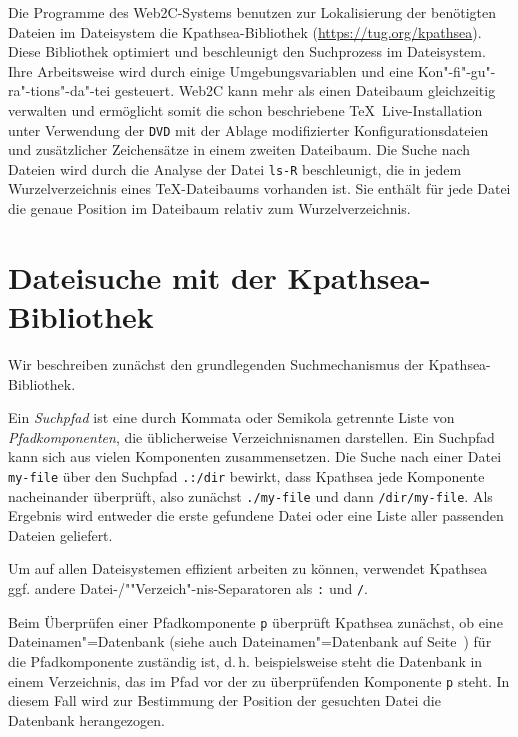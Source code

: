 \documentclass[12pt,ngerman,a4paper,fullparskip]{report}
\newcommand{\TL}{\TeX\ Live\xspace}
\newcommand{\acro}[1]{\texttt{#1}}
\newcommand{\file}[1]{\texttt{#1}}
\newcommand{\KPS}{Kpathsea\xspace}
\newcommand{\var}[1]{\texttt{#1}}
\newcommand{\samp}[1]{\texttt{#1}}
\providecommand*{\DVD}{\acro{DVD}\xspace}
\begin{document}
\noindent Die Programme des Web2C-Systems benutzen zur Lokalisierung der benötigten
Dateien im Dateisystem die \KPS-Bibliothek (\url{https://tug.org/kpathsea}). Diese Bibliothek optimiert und beschleunigt den Suchprozess im Dateisystem. Ihre Arbeitsweise wird durch
einige Umgebungsvariablen und eine Kon"-fi"-gu"-ra"-tions"-da"-tei gesteuert.
Web2C kann mehr als einen Dateibaum gleichzeitig verwalten und ermöglicht
somit die schon beschriebene \TL-Installation unter Verwendung der
{\DVD} mit der Ablage modifizierter Konfigurationsdateien
und zusätzlicher Zeichensätze in einem zweiten Dateibaum. Die Suche
nach Dateien wird durch die Analyse der Datei \file{ls-R} beschleunigt,
die in jedem Wurzelverzeichnis eines \TeX-Dateibaums vorhanden ist.
Sie enthält für jede Datei die genaue Position im Dateibaum relativ
zum Wurzelverzeichnis.


\section{Dateisuche mit der Kpathsea-Bibliothek}
\label{sec:kpathsea}

Wir beschreiben zunächst den grundlegenden Suchmechanismus der \KPS-Bibliothek.

Ein \textit{Suchpfad} ist eine durch Kommata oder Semikola getrennte Liste von
\textit{Pfadkomponenten}, die üblicherweise Verzeichnisnamen darstellen.
Ein Suchpfad kann sich aus vielen Komponenten zusammensetzen. Die Suche nach
einer Datei \samp{my-file} über den Suchpfad \samp{.:/dir} bewirkt, dass
{\KPS} jede Komponente nacheinander überprüft, also zunächst
\samp{./my-file} und dann \samp{/dir/my-file}. Als Ergebnis wird entweder die
erste gefundene Datei oder eine Liste aller passenden Dateien geliefert.

Um auf allen Dateisystemen effizient arbeiten zu können, verwendet {\KPS} ggf. andere Datei-/""Verzeich"-nis-Separatoren als \samp{:} und \samp{/}.

Beim Überprüfen einer Pfadkomponente \var{p} überprüft {\KPS} zunächst,
ob eine Dateinamen"=Datenbank (siehe auch Dateinamen"=Datenbank auf
Seite~\pageref{sec:filename-database}) für die Pfadkomponente zuständig ist,
d.\,h. beispielsweise steht die Datenbank in einem Verzeichnis, das im Pfad
vor der zu überprüfenden Komponente \var{p} steht. In diesem Fall wird
zur Bestimmung der Position der gesuchten Datei die Datenbank herangezogen.
\end{document}
